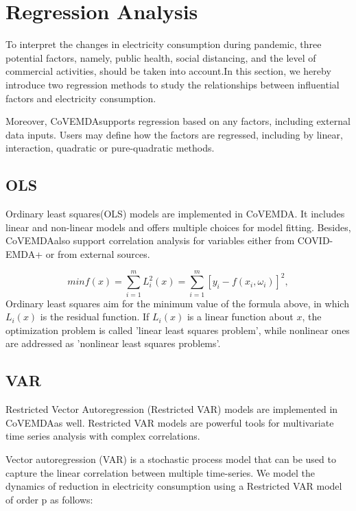 \documentclass[10pt]{article}
\newcommand{\covemda}{CoVEMDA}
\numberwithin{equation}{section}
\numberwithin{table}{section}
\numberwithin{figure}{section}
\begin{document}
\newpage
\section{Regression Analysis} \label{sec:regression}
 
To interpret the changes in electricity consumption during pandemic, three potential factors, namely, public health, social distancing, and the level of commercial activities, should be taken into account.In this section, we hereby introduce two regression methods to study the relationships between influential factors and electricity consumption.

Moreover, \covemda \quad supports regression based on any factors, including external data inputs. Users may define how the factors are regressed, including by linear, interaction, quadratic or pure-quadratic methods.

\subsection{OLS}\label{subsec:ols}

Ordinary least squares(OLS) models are implemented in \covemda. It includes linear and non-linear models and offers multiple choices for model fitting. Besides, \covemda \quad also support correlation analysis for variables either from COVID-EMDA+ or from external sources.

\begin{equation}
  min f(x)=\sum^{m}_{i=1}L_i^2(x)=\sum^{m}_{i=1}[y_i-f(x_i,\omega_i)]^2,
\end{equation}
Ordinary least squares aim for the minimum value of the formula above, in which $L_i(x)$ is the residual function. If $L_i(x)$ is a linear function about $x$, the optimization problem is called 'linear least squares problem', while nonlinear ones are addressed as 'nonlinear least squares problems'. 

\subsection{VAR}\label{subsec:var}


Restricted Vector Autoregression (Restricted VAR) models are implemented in \covemda as well. Restricted VAR models are powerful tools for multivariate time series analysis with complex correlations.

Vector autoregression (VAR)\cite{var} is a stochastic process model that can be used to capture the linear correlation between multiple time-series. We model the dynamics of reduction in electricity consumption using a Restricted VAR model of order p as follows:
\end{document}
